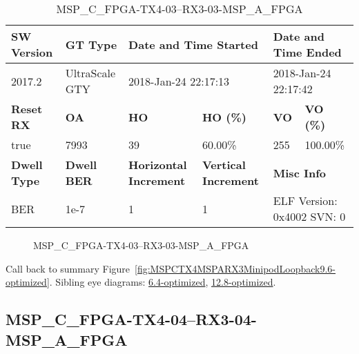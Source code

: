 \begin{table}[h]
\centering
\caption{MSP\_C\_FPGA-TX4-03--RX3-03-MSP\_A\_FPGA}
\label{tab:MSPCFPGATX403RX303MSPAFPGA9.6-optimized}
\begin{tabular}{@{}|l|l|l|l|l|l|@{}}
\toprule
\textbf{SW Version}                & \textbf{GT Type}   & \multicolumn{2}{l|}{\textbf{Date and Time Started}}            & \multicolumn{2}{l|}{\textbf{Date and Time Ended}}        \\ \midrule
2017.2                       & UltraScale GTY          & \multicolumn{2}{l|}{2018-Jan-24 22:17:13}                   & \multicolumn{2}{l|}{2018-Jan-24 22:17:42}               \\ \midrule
\textbf{Reset RX}                  & \textbf{OA} & \textbf{HO}   & \textbf{HO (\%)} & \textbf{VO} & \textbf{VO (\%)} \\ \midrule
true & 7993        & 39          & 60.00\%        & 255        & 100.00\%       \\ \midrule
\textbf{Dwell Type}                & \textbf{Dwell BER} & \textbf{Horizontal Increment} & \textbf{Vertical Increment}    & \multicolumn{2}{l|}{\textbf{Misc Info}}                  \\ \midrule
BER                            & 1e-7        & 1        & 1           & \multicolumn{2}{l|}{ELF Version: 0x4002 SVN: 0}                         \\ \bottomrule
\end{tabular}
\end{table}

\begin{figure}[h]
\caption{MSP\_C\_FPGA-TX4-03--RX3-03-MSP\_A\_FPGA} \label{fig:MSPCFPGATX403RX303MSPAFPGA9.6-optimized}
\end{figure}

Call back to summary Figure~\ref{fig:MSPCTX4MSPARX3MinipodLoopback9.6-optimized}.
Sibling eye diagrams: \hyperref[sec:MSPCFPGATX403RX303MSPAFPGA6.4-optimized]{6.4-optimized}, \hyperref[sec:MSPCFPGATX403RX303MSPAFPGA12.8-optimized]{12.8-optimized}.

\clearpage
\newpage


\subsection{MSP\_C\_FPGA-TX4-04--RX3-04-MSP\_A\_FPGA}\label{sec:MSPCFPGATX404RX304MSPAFPGA9.6-optimized}

